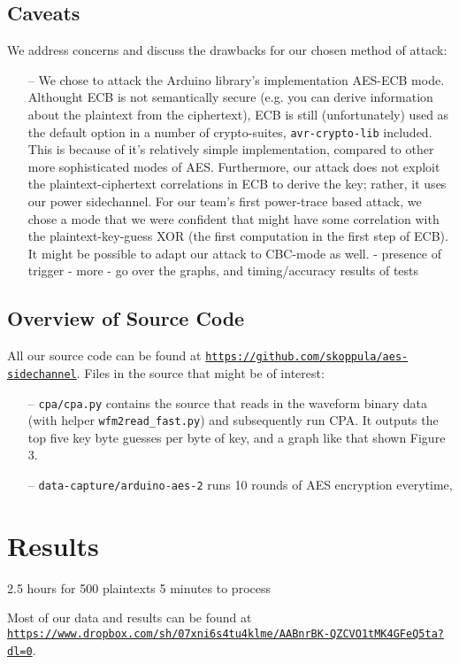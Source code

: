 \documentclass[journal]{ieee_style}
\begin{document}
\subsection{Caveats}
We address concerns and discuss the drawbacks for our chosen method of attack:
\begin{itemize}
    \item[--] We chose to attack the Arduino library's implementation AES-ECB mode. Althought ECB is not semantically secure (e.g. you can derive information about the plaintext from the ciphertext), ECB is still (unfortunately) used as the default option in a number of crypto-suites, \texttt{avr-crypto-lib} included. This is because of it's relatively simple implementation, compared to other more sophisticated modes of AES. Furthermore, our attack does not exploit the plaintext-ciphertext correlations in ECB to derive the key; rather, it uses our power sidechannel. For our team's first power-trace based attack, we chose a mode that we were confident that might have some correlation with the plaintext-key-guess XOR (the first computation in the first step of ECB). It might be possible to adapt our attack to CBC-mode as well.
- presence of trigger
- more
- go over the graphs, and timing/accuracy results of tests
\end{itemize}
\subsection{Overview of Source Code}
All our source code can be found at \texttt{\url{https://github.com/skoppula/aes-sidechannel}}. Files in the source that might be of interest:
\begin{itemize}
    \item[--] \texttt{cpa/cpa.py} contains the source that reads in the waveform binary data (with helper \texttt{wfm2read_fast.py}) and subsequently run CPA. It outputs the top five key byte guesses per byte of key, and a graph like that shown Figure 3.
    \item[--] \texttt{data-capture/arduino-aes-2} runs 10 rounds of AES encryption everytime, 
\end{itemize}

\section{Results}
2.5 hours for 500 plaintexts
5 minutes to process

Most of our data and results can be found at \texttt{\url{https://www.dropbox.com/sh/07xni6s4tu4klme/AABnrBK-QZCVO1tMK4GFeQ5ta?dl=0}}.
\end{document}
